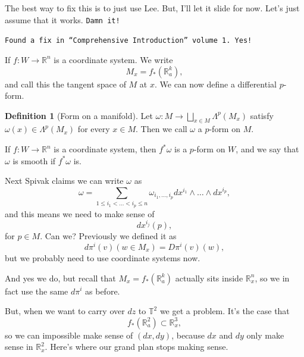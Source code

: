 \documentclass{article}
\theoremstyle{definition}
\newtheorem{defi}{Definition}
\begin{document}
The best way to fix this is to just use Lee. But, I'll let it slide for now. Let's just assume that it works. {\tt Damn it!}

{\tt Found a fix in ``Comprehensive Introduction'' volume 1. Yes!}

If $f:W\to\mathbb{R}^n$ is a coordinate system. We write
\[M_x=f_\ast(\mathbb{R}^k_a),\]
and call this the tangent space of $M$ at $x$. We can now define a differential $p$-form.
\begin{defi}[Form on a manifold]
  Let $\omega:M\to\bigsqcup_{x\in M}\Lambda^p(M_x)$ satisfy $\omega(x)\in\Lambda^p(M_x)$ for every $x\in M$. Then we call $\omega$ a $p$-form on $M$.

  If $f:W\to\mathbb{R}^n$ is a coordinate system, then $f^\ast\omega$ is a $p$-form on $W$, and we say that $\omega$ is smooth if $f^\ast\omega$ is.
\end{defi}
Next Spivak claims we can write $\omega$ as
\[\omega=\sum_{1\leq i_1<\dots<i_p\leq n}\omega_{i_1,\dots,i_p}dx^{i_1}\land\dots\land dx^{i_p},\]
and this means we need to make sense of
\[dx^{i_j}(p),\]
for $p\in M$. Can we? Previously we defined it as
\[d\pi^i(v)(w\in M_x)=D\pi^i(v)(w),\]
but we probably need to use coordinate systems now.

And yes we do, but recall that $M_x=f_\ast(\mathbb{R}^k_a)$ actually sits inside $\mathbb{R}^n_x$, so we in fact use the same $d\pi^i$ as before.

But, when we want to carry over $dz$ to $\mathbb{T}^2$ we get a problem. It's the case that
\[f_\ast(\mathbb{R}^2_a)\subset\mathbb{R}^3_x,\]
so we can impossible make sense of $(dx,dy)$, because $dx$ and $dy$ only make sense in $\mathbb{R}^2_x$. Here's where our grand plan stops making sense.
\end{document}
